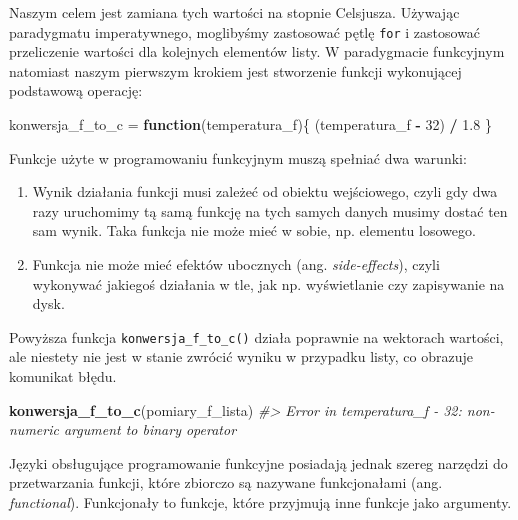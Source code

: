 \documentclass[paper=6in:9in,pagesize=pdftex,headinclude=on,footinclude=on,10pt]{scrbook}
\makeatletter
\newenvironment{Shaded}{\begin{snugshade}}{\end{snugshade}}
\newcommand{\CommentTok}[1]{\textcolor[rgb]{0.56,0.35,0.01}{\textit{#1}}}
\newcommand{\ControlFlowTok}[1]{\textcolor[rgb]{0.13,0.29,0.53}{\textbf{#1}}}
\newcommand{\DecValTok}[1]{\textcolor[rgb]{0.00,0.00,0.81}{#1}}
\newcommand{\FloatTok}[1]{\textcolor[rgb]{0.00,0.00,0.81}{#1}}
\newcommand{\KeywordTok}[1]{\textcolor[rgb]{0.13,0.29,0.53}{\textbf{#1}}}
\newcommand{\NormalTok}[1]{#1}
\newcommand{\OperatorTok}[1]{\textcolor[rgb]{0.81,0.36,0.00}{\textbf{#1}}}
\newcommand{\StringTok}[1]{\textcolor[rgb]{0.31,0.60,0.02}{#1}}
\providecommand{\tightlist}{%
  \setlength{\itemsep}{0pt}\setlength{\parskip}{0pt}}
\newenvironment{kframe}{%
\medskip{}
\setlength{\fboxsep}{.8em}
 \def\at@end@of@kframe{}%
 \ifinner\ifhmode%
  \def\at@end@of@kframe{\end{minipage}}%
  \begin{minipage}{\columnwidth}%
 \fi\fi%
 \def\FrameCommand##1{\hskip\@totalleftmargin \hskip-\fboxsep
 \colorbox{shadecolor}{##1}\hskip-\fboxsep
     \hskip-\linewidth \hskip-\@totalleftmargin \hskip\columnwidth}%
 \MakeFramed {\advance\hsize-\width
   \@totalleftmargin\z@ \linewidth\hsize
   \@setminipage}}%
 {\par\unskip\endMakeFramed%
 \at@end@of@kframe}
\newenvironment{rmdblock}[1]
  {
  \begin{itemize}
  \renewcommand{\labelitemi}{
    \raisebox{-.7\height}[0pt][0pt]{
      {\setkeys{Gin}{width=3em,keepaspectratio}\texttt{[image: images/\#1]}}
    }
  }
  \setlength{\fboxsep}{1em}
  \begin{kframe}
  \item
  }
  {
  \end{kframe}
  \end{itemize}
  }
\newenvironment{rmdinfo}
  {\begin{rmdblock}{compass}}
  {\end{rmdblock}}
\makeatother
\begin{document}
Naszym celem jest zamiana tych wartości na stopnie Celsjusza.
Używając paradygmatu imperatywnego, moglibyśmy zastosować pętlę \texttt{for} i zastosować przeliczenie wartości dla kolejnych elementów listy.
W paradygmacie funkcyjnym natomiast naszym pierwszym krokiem jest stworzenie funkcji wykonującej podstawową operację:

\begin{Shaded}
\begin{Highlighting}[]
\NormalTok{konwersja_f_to_c =}\StringTok{ }\ControlFlowTok{function}\NormalTok{(temperatura_f)\{}
\NormalTok{    (temperatura_f }\OperatorTok{-}\StringTok{ }\DecValTok{32}\NormalTok{) }\OperatorTok{/}\StringTok{ }\FloatTok{1.8}
\NormalTok{\}}
\end{Highlighting}
\end{Shaded}

\begin{rmdinfo}
Funkcje użyte w programowaniu funkcyjnym muszą spełniać dwa warunki:

\begin{enumerate}
\def\labelenumi{\arabic{enumi}.}
\tightlist
\item
  Wynik działania funkcji musi zależeć od obiektu wejściowego, czyli gdy dwa razy uruchomimy tą samą funkcję na tych samych danych musimy dostać ten sam wynik.
  Taka funkcja nie może mieć w sobie, np. elementu losowego.
\item
  Funkcja nie może mieć efektów ubocznych (ang. \emph{side-effects}), czyli wykonywać jakiegoś działania w tle, jak np. wyświetlanie czy zapisywanie na dysk.
\end{enumerate}
\end{rmdinfo}

Powyższa funkcja \texttt{konwersja\_f\_to\_c()} działa poprawnie na wektorach wartości, ale niestety nie jest w stanie zwrócić wyniku w przypadku listy, co obrazuje komunikat błędu.

\begin{Shaded}
\begin{Highlighting}[]
\KeywordTok{konwersja_f_to_c}\NormalTok{(pomiary_f_lista)}
\CommentTok{#> Error in temperatura_f - 32: non-numeric argument to binary operator}
\end{Highlighting}
\end{Shaded}

Języki obsługujące programowanie funkcyjne posiadają jednak szereg narzędzi do przetwarzania funkcji, które zbiorczo są nazywane funkcjonałami (ang. \emph{functional}).
Funkcjonały to funkcje, które przyjmują inne funkcje jako argumenty.
\end{document}
